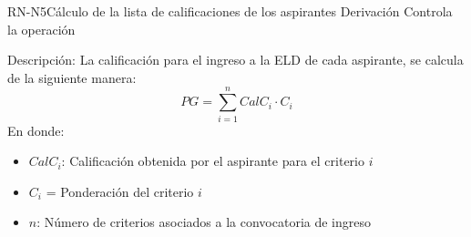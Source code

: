 \begin{BusinessRule}{RN-N5}{Cálculo de la lista de calificaciones de los aspirantes}
	{Derivación}
	{Controla la operación}
	\item[Descripción:] 
	La calificación para el ingreso a la ELD de cada aspirante, se calcula de la siguiente manera:
	\[
	PG=\sum_{i=1}^n CalC_{i}\cdot {C_{i}}
	\]
	En donde: 
	\begin{itemize}
		\item $CalC_{i}$: Calificación obtenida por el aspirante para el criterio $i$
		\item $C_i$ = Ponderación del criterio $i$
		\item $n$: Número de criterios asociados a la convocatoria de ingreso
	\end{itemize}
\end{BusinessRule}

